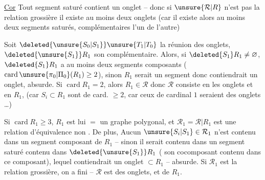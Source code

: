 \uline{Cor} Tout  segment saturé contient un onglet -- donc si $\unsure{\mathcal{R}|R}$ n'est pas la relation grossière il existe au moins deux onglets (car il existe alors au moins deux segments saturés, complémentaires l'un de l'autre)

Soit  $\deleted{\unsure{S_{0}|S_1}}\unsure{T_{1}|T_{0}}$ la réunion des onglets, $\deleted{\unsure{S_1}}R_1$ son complémentaire. Alors, si $\deleted{S_1}R_1\ne\varnothing$, $\deleted{S_1}R_1$ a au moins deux segments composants ($\operatorname{card}\unsure{\pi_0|\Pi_0}(R_1)\geq 2$), sinon $R_1$ serait un segment donc contiendrait un onglet, absurde. Si $\operatorname{card} R_1=2$, alors $R_1\in\mathcal{R}$  donc $\mathcal{R}$ consiste en les onglets et en $R_1$, (car   $S_i\subset R_1$ sont de card. $\geq 2$,  car ceux de cardinal $1$ seraient des onglets \ldots)

Si $\operatorname{card} R_1\geq 3$, $R_1$ est lui $=$ un graphe polygonal, et $\mathcal{R}_1=\mathcal{R}\vert R_1$ est une relation d'équivalence non . De plus, Aucun $\unsure{S_i|S_1}\in\mathcal{R}_1$ n'est contenu dans un segment composant de $R_1$ -- sinon il serait contenu dans un segment saturé contenu dans $\deleted{\unsure{S_1}}R_1$ ( son cocomposant contenu dans ce composant), lequel contiendrait un onglet $\subset R_1$ -- absurde. Si $\mathcal{R}_1$ est la relation grossière, on a fini -- $\mathcal{R}$ est  des onglets, et de $R_1$.

